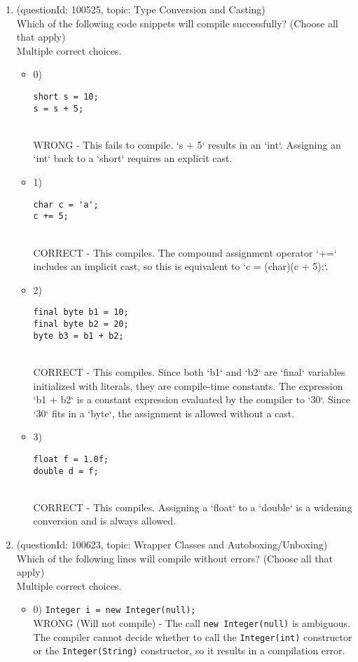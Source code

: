 \documentclass[12pt]{article}
\begin{document}
\begin{enumerate}[label=(\arabic*)]
\begin{itemize}
\end{itemize}
\item (questionId: 100525, topic: Type Conversion and Casting) \\ 
Which of the following code snippets will compile successfully? (Choose all that apply)
\\ \noindent Multiple correct choices. 
\begin{itemize}
\item 0) \begin{verbatim}
short s = 10;
s = s + 5;
\end{verbatim}
 \\ 
WRONG - This fails to compile. `s + 5` results in an `int`. Assigning an `int` back to a `short` requires an explicit cast.

\item 1) \begin{verbatim}
char c = 'a';
c += 5;
\end{verbatim}
 \\ 
CORRECT - This compiles. The compound assignment operator `+=` includes an implicit cast, so this is equivalent to `c = (char)(c + 5);`.

\item 2) \begin{verbatim}
final byte b1 = 10;
final byte b2 = 20;
byte b3 = b1 + b2;
\end{verbatim}
 \\ 
CORRECT - This compiles. Since both `b1` and `b2` are `final` variables initialized with literals, they are compile-time constants. The expression `b1 + b2` is a constant expression evaluated by the compiler to `30`. Since `30` fits in a `byte`, the assignment is allowed without a cast.

\item 3) \begin{verbatim}
float f = 1.0f;
double d = f;
\end{verbatim}
 \\ 
CORRECT - This compiles. Assigning a `float` to a `double` is a widening conversion and is always allowed.

\end{itemize}
\item (questionId: 100623, topic: Wrapper Classes and Autoboxing/Unboxing) \\ 
Which of the following lines will compile without errors? (Choose all that apply)
\\ \noindent Multiple correct choices. 
\begin{itemize}
\item 0) \verb|Integer i = new Integer(null);|
 \\ 
WRONG (Will not compile) - The call \verb|new Integer(null)| is ambiguous. The compiler cannot decide whether to call the \verb|Integer(int)| constructor or the \verb|Integer(String)| constructor, so it results in a compilation error.


\end{itemize}
\end{enumerate}
\end{document}
